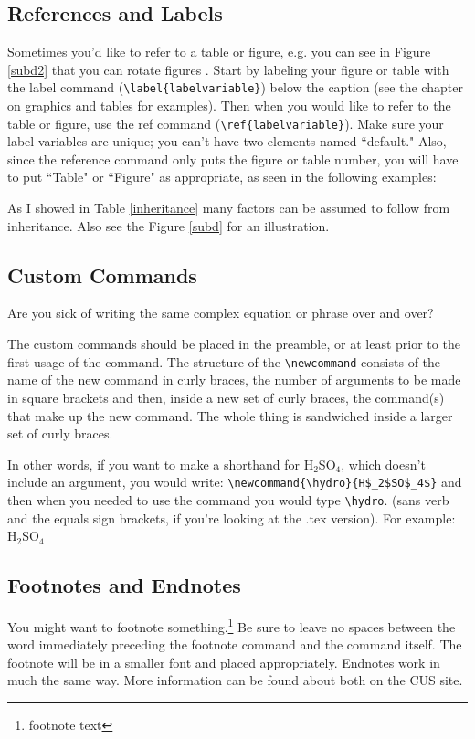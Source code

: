\documentclass[12pt,twoside]{reedthesis}
\begin{document}
\subsection{References and Labels}
Sometimes you'd like to refer to a table or figure, e.g. you can see in Figure \ref{subd2} that you can rotate figures . Start by labeling your figure or table with the label command (\verb=\label{labelvariable}=) below the caption (see the chapter on graphics and tables for examples). Then when you would like to refer to the table or figure, use the ref command (\verb=\ref{labelvariable}=). Make sure your label variables are unique; you can't have two elements named ``default." Also, since the reference command only puts the figure or table number, you will have to put  ``Table" or ``Figure" as appropriate, as seen in the following examples:

 As I showed in Table \ref{inheritance} many factors can be assumed to follow from inheritance. Also see the Figure \ref{subd} for an illustration.
 
\subsection{Custom Commands}\label{commands}
Are you sick of writing the same complex equation or phrase over and over? 

The custom commands should be placed in the preamble, or at least prior to the first usage of the command. The structure of the \verb=\newcommand= consists of the name of the new command in curly braces, the number of arguments to be made in square brackets and then, inside a new set of curly braces, the command(s) that make up the new command. The whole thing is sandwiched inside a larger set of curly braces. 

\newcommand{\hydro}{H$_2$SO$_4$}

In other words, if you want to make a shorthand for H$_2$SO$_4$, which doesn't include an argument, you would write: \verb=\newcommand{\hydro}{H$_2$SO$_4$}= and then when you needed  to use the command you would type \verb=\hydro=. (sans verb and the equals sign brackets, if you're looking at the .tex version). For example: \hydro

\subsection{Footnotes and Endnotes}
	You might want to footnote something.\footnote{footnote text} Be sure to leave no spaces between the word immediately preceding the footnote command and the command itself. The footnote will be in a smaller font and placed appropriately. Endnotes work in much the same way. More information can be found about both on the CUS site.
	
\end{document}
